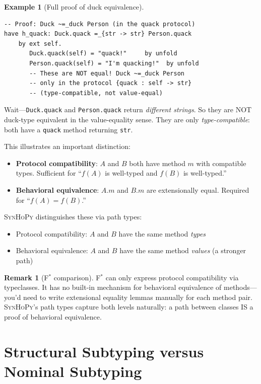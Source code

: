 \documentclass[11pt,a4paper]{report}
\theoremstyle{definition}
\newtheorem{example}[definition]{Example}
\newtheorem{remark}[definition]{Remark}
\theoremstyle{plain}
\newcommand{\fstar}{F$^{*}$}
\newcommand{\synhopy}{\textsc{SynHoPy}}
\begin{document}
\begin{example}[Full proof of duck equivalence]
\begin{lstlisting}[style=proof]
-- Proof: Duck ~=_duck Person (in the quack protocol)
have h_quack: Duck.quack =_{str -> str} Person.quack
    by ext self.
       Duck.quack(self) = "quack!"     by unfold
       Person.quack(self) = "I'm quacking!"  by unfold
       -- These are NOT equal! Duck ~=_duck Person
       -- only in the protocol {quack : self -> str}
       -- (type-compatible, not value-equal)
\end{lstlisting}
Wait---\lstinline[style=python]{Duck.quack} and \lstinline[style=python]{Person.quack}
return \emph{different strings}. So they are NOT duck-type equivalent in the
value-equality sense. They are only \emph{type-compatible}: both have
a \texttt{quack} method returning \texttt{str}.

This illustrates an important distinction:
\begin{itemize}
  \item \textbf{Protocol compatibility}: $A$ and $B$ both have method $m$ with
    compatible types. Sufficient for ``$f(A)$ is well-typed and $f(B)$ is well-typed.''
  \item \textbf{Behavioral equivalence}: $A.m$ and $B.m$ are extensionally equal.
    Required for ``$f(A) = f(B)$.''
\end{itemize}
\synhopy{} distinguishes these via path types:
\begin{itemize}
  \item Protocol compatibility: $A$ and $B$ have the same method \emph{types}
  \item Behavioral equivalence: $A$ and $B$ have the same method \emph{values}
    (a stronger path)
\end{itemize}
\end{example}

\begin{remark}[\fstar{} comparison]
\fstar{} can only express protocol compatibility via typeclasses. It has no
built-in mechanism for behavioral equivalence of methods---you'd need to write
extensional equality lemmas manually for each method pair. \synhopy{}'s path
types capture both levels naturally: a path between classes IS a proof of
behavioral equivalence.
\end{remark}


\section{Structural Subtyping versus Nominal Subtyping}
\label{sec:structural-vs-nominal}
\end{document}
